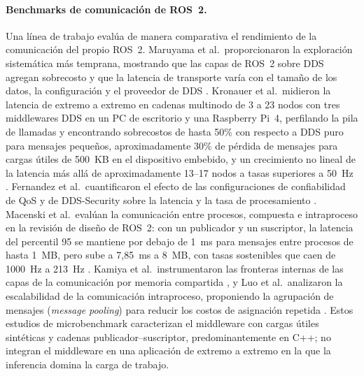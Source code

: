 \paragraph{Benchmarks de comunicación de ROS~2.}
Una línea de trabajo evalúa de manera comparativa el rendimiento de la
comunicación del propio ROS~2. Maruyama et al.\ proporcionaron la
exploración sistemática más temprana, mostrando que las capas de ROS~2 sobre
DDS agregan sobrecosto y que la latencia de transporte varía con el tamaño
de los datos, la configuración y el proveedor de DDS \cite{maruyama2016}.
Kronauer et al.\ midieron la latencia de extremo a extremo en cadenas
multinodo de 3 a 23 nodos con tres middlewares DDS en un PC de escritorio y
una Raspberry Pi~4, perfilando la pila de llamadas y encontrando sobrecostos
de hasta 50\% con respecto a DDS puro para mensajes pequeños,
aproximadamente 30\% de pérdida de mensajes para cargas útiles de 500~KB en
el dispositivo embebido, y un crecimiento no lineal de la latencia más allá
de aproximadamente 13--17 nodos a tasas superiores a 50~Hz
\cite{kronauer2021}. Fernandez et al.\ cuantificaron el efecto de las
configuraciones de confiabilidad de QoS y de DDS-Security sobre la latencia
y la tasa de procesamiento \cite{fernandez2020}. Macenski et al.\ evalúan la
comunicación entre procesos, compuesta e intraproceso en la revisión de
diseño de ROS~2: con un publicador y un suscriptor, la latencia del
percentil 95 se mantiene por debajo de 1~ms para mensajes entre procesos de
hasta 1~MB, pero sube a 7,85~ms a 8~MB, con tasas sostenibles que caen de
1000~Hz a 213~Hz \cite{macenski2022}. Kamiya et al.\ instrumentaron las
fronteras internas de las capas de la comunicación por memoria compartida
\cite{kamiya2025}, y Luo et al.\ analizaron la escalabilidad de la
comunicación intraproceso, proponiendo la agrupación de mensajes
(\emph{message pooling}) para reducir los costos de asignación repetida
\cite{luo2025}. Estos estudios de microbenchmark caracterizan el middleware
con cargas útiles sintéticas y cadenas publicador--suscriptor,
predominantemente en C++; no integran el middleware en una aplicación de
extremo a extremo en la que la inferencia domina la carga de trabajo.


